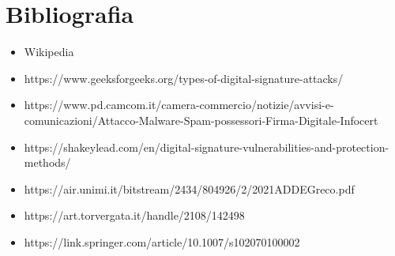 \chapter{Bibliografia}

\begin{itemize}
	\item Wikipedia
	\item https://www.geeksforgeeks.org/types-of-digital-signature-attacks/
	\item https://www.pd.camcom.it/camera-commercio/notizie/avvisi-e-comunicazioni/Attacco-Malware-Spam-possessori-Firma-Digitale-Infocert
	\item https://shakeylead.com/en/digital-signature-vulnerabilities-and-protection-methods/
	\item https://air.unimi.it/bitstream/2434/804926/2/2021ADDEGreco.pdf
	\item https://art.torvergata.it/handle/2108/142498
	\item https://link.springer.com/article/10.1007/s102070100002
\end{itemize}